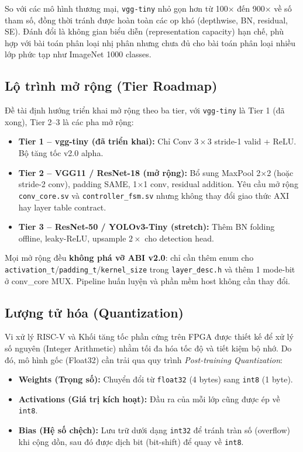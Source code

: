 So với các mô hình thương mại, \texttt{vgg-tiny} nhỏ gọn hơn từ 100$\times$ đến 900$\times$ về số tham số, đồng thời tránh được hoàn toàn các op khó (depthwise, BN, residual, SE). Đánh đổi là không gian biểu diễn (representation capacity) hạn chế, phù hợp với bài toán phân loại nhị phân nhưng chưa đủ cho bài toán phân loại nhiều lớp phức tạp như ImageNet 1000 classes.

\subsection{Lộ trình mở rộng (Tier Roadmap)}
\label{sec:tier_roadmap}
Đề tài định hướng triển khai mở rộng theo ba tier, với \texttt{vgg-tiny} là Tier 1 (đã xong), Tier 2--3 là các pha mở rộng:

\begin{itemize}
    \item \textbf{Tier 1 -- vgg-tiny (đã triển khai):} Chỉ Conv $3 \times 3$ stride-1 valid + ReLU. Bộ tăng tốc v2.0 alpha.
    \item \textbf{Tier 2 -- VGG11 / ResNet-18 (mở rộng):} Bổ sung MaxPool 2$\times$2 (hoặc stride-2 conv), padding SAME, 1$\times$1 conv, residual addition. Yêu cầu mở rộng \texttt{conv\_core.sv} và \texttt{controller\_fsm.sv} nhưng không thay đổi giao thức AXI hay layer table contract.
    \item \textbf{Tier 3 -- ResNet-50 / YOLOv3-Tiny (stretch):} Thêm BN folding offline, leaky-ReLU, upsample $2\times$ cho detection head.
\end{itemize}

Mọi mở rộng đều \textbf{không phá vỡ ABI v2.0}: chỉ cần thêm enum cho \texttt{activation\_t}/\texttt{padding\_t}/\texttt{kernel\_size} trong \texttt{layer\_desc.h} và thêm 1 mode-bit ở conv\_core MUX. Pipeline huấn luyện và phần mềm host không cần thay đổi.

\subsection{Lượng tử hóa (Quantization)}
Vi xử lý RISC-V và Khối tăng tốc phần cứng trên FPGA được thiết kế để xử lý số nguyên (Integer Arithmetic) nhằm tối đa hóa tốc độ và tiết kiệm bộ nhớ. Do đó, mô hình gốc (Float32) cần trải qua quy trình \textit{Post-training Quantization}:

\begin{itemize}
    \item \textbf{Weights (Trọng số):} Chuyển đổi từ \texttt{float32} (4 bytes) sang \texttt{int8} (1 byte).
    \item \textbf{Activations (Giá trị kích hoạt):} Đầu ra của mỗi lớp cũng được ép về \texttt{int8}.
    \item \textbf{Bias (Hệ số chệch):} Lưu trữ dưới dạng \texttt{int32} để tránh tràn số (overflow) khi cộng dồn, sau đó được dịch bit (bit-shift) để quay về \texttt{int8}.
\end{itemize}


